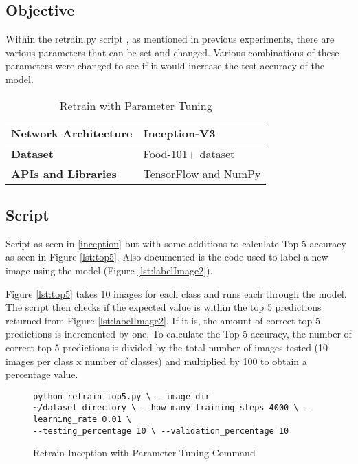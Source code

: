 \tocless\subsection{Objective}
Within the retrain.py script \parencite{retrainInception}, as mentioned in
previous experiments, there are various parameters that can be set and changed.
Various combinations of these parameters were changed to see if it would increase the
test accuracy of the model.

\begin{table}[h]
\centering
\caption{Retrain with Parameter Tuning}
\label{my-label}
\begin{tabular}{|l|p{8cm}|}
\hline
\textbf{Network Architecture} & Inception-V3           \\ \hline
\textbf{Dataset}              & Food-101+ dataset \\ \hline
\textbf{APIs and Libraries}   & TensorFlow and NumPy                                                       \\ \hline
\end{tabular}
\end{table}

\tocless\subsection{Script}
Script as seen in \ref{inception} but with some additions to calculate Top-5 accuracy as seen
in Figure \ref{lst:top5}.
Also documented is the code used to label a new image using the model (Figure \ref{lst:labelImage2}).

Figure \ref{lst:top5} takes 10 images for each class and runs each through the model.
The script then checks if the expected value is within the top 5 predictions returned from Figure \ref{lst:labelImage2}.
If it is, the amount of correct top 5 predictions is incremented by one.
To calculate the Top-5 accuracy, the number of correct top 5 predictions is divided by the total number of images tested (10 images per class x number of classes) and multiplied by 100 to obtain a percentage value.


\begin{figure}[h]
\caption{Retrain Inception with Parameter Tuning Command}
\label{lst:retrainParameterCommand}
\begin{lstlisting}[style=Python]
python retrain_top5.py \ --image_dir
~/dataset_directory \ --how_many_training_steps 4000 \ --learning_rate 0.01 \
--testing_percentage 10 \ --validation_percentage 10
\end{lstlisting}
\end{figure}

